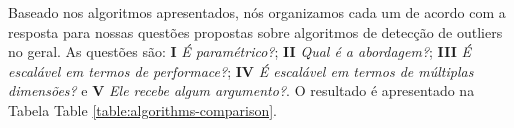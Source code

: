 

\vspace{25pt}


Baseado nos algoritmos apresentados, nós organizamos cada um de acordo com a resposta para nossas questões propostas sobre algoritmos de detecção de outliers no geral. As questões são: \textbf{I} \textit{É paramétrico?}; \textbf{II} \textit{Qual é a abordagem?}; \textbf{III} \textit{É escalável em termos de performace?}; \textbf{IV} \textit{É escalável em termos de múltiplas dimensões?} e \textbf{V} \textit{Ele recebe algum argumento?}. O resultado é apresentado na Tabela Table \ref{table:algorithms-comparison}.

